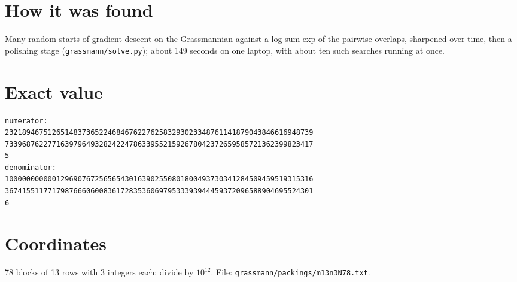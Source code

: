\documentclass[11pt,a4paper]{article}
\begin{document}
\section{How it was found}
Many random starts of gradient descent on the Grassmannian against a log-sum-exp of the pairwise overlaps, sharpened over time, then a polishing stage (\texttt{grassmann/solve.py}); about 149 seconds on one laptop, with about ten such searches running at once.


\appendix
\section{Exact value}
{\small
\begin{verbatim}
numerator:
232189467512651483736522468467622762583293023348761141879043846616948739
733968762277163979649328242247863395521592678042372659585721362399823417
5
denominator:
100000000000129690767256565430163902550801800493730341284509459519315316
367415511771798766606008361728353606979533393944459372096588904695524301
6
\end{verbatim}}

\section{Coordinates}
78 blocks of 13 rows with 3 integers each; divide by $10^{12}$. File: \texttt{grassmann/packings/m13n3N78.txt}.
{\tiny
\begin{multicols}{3}
\end{multicols}}
\end{document}
